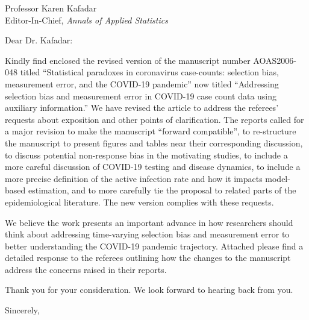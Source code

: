 \documentclass[11pt]{letter} %
\begin{document}

\begin{letter}{Professor Karen Kafadar \\
    Editor-In-Chief, {\em Annals of Applied Statistics}
         }


\signature{Walter Dempsey\\
University of Michigan \\
Department of Biostatistics\\
M4057 SPH II \\
1415 Washington Heights \\
wdem@umich.edu} %


\date\today

\opening{Dear Dr. Kafadar:}

Kindly find enclosed the revised version of the manuscript number AOAS2006-048 titled ``Statistical paradoxes in coronavirus case-counts: selection bias, measurement error, and the COVID-19 pandemic'' now titled ``Addressing selection bias and measurement error in COVID-19 case count data using auxiliary information.''  We have revised the article to address the referees’ requests about exposition and other points of clarification.  The reports called for a major revision to make the manuscript ``forward compatible'', to re-structure the manuscript to present figures and tables near their corresponding discussion, to discuss potential non-response bias in the motivating studies, to include a more careful discussion of COVID-19 testing and disease dynamics, to include a more precise definition of the active infection rate and how it impacts model-based estimation, and to more carefully tie the proposal to related parts of the epidemiological literature. The new version complies with these requests.

We believe the work presents an important advance in how researchers should think about addressing time-varying selection bias and measurement error to better understanding the COVID-19 pandemic trajectory. Attached please find a detailed response to the referees outlining how the changes to the manuscript address the concerns raised in their reports.

Thank you for your consideration. We look forward to hearing back from you.

\closing{Sincerely,}


\end{letter}
\end{document}
